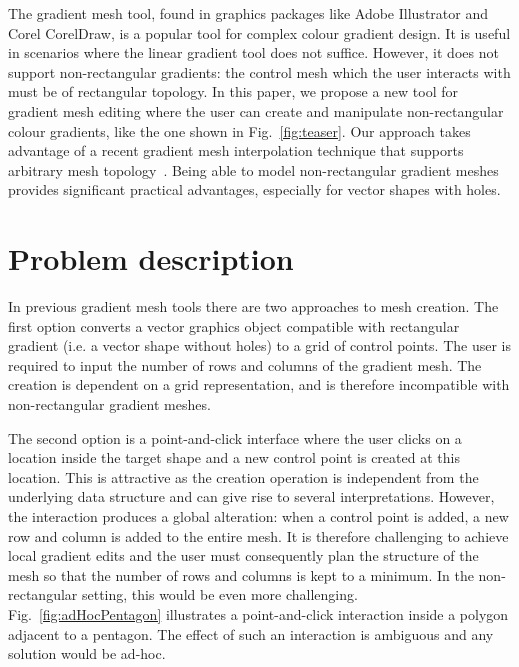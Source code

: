 \documentclass{egpubl}
\newcommand{\note}[3]{{\color{#2}\textbf{#1: #3}}}
\newcommand{\john}[1]{\note{JohnKa}{RubineRed}{#1}}
\begin{document}
	The gradient mesh tool, found in graphics packages like Adobe Illustrator and Corel CorelDraw, is a popular tool for complex colour gradient design. It is useful in scenarios where the linear gradient tool does not suffice. However, it does not support non-rectangular gradients: the control mesh which the user interacts with must be of rectangular topology. In this paper, we propose a new tool for gradient mesh editing where the user can create and manipulate non-rectangular colour gradients, like the one shown in Fig.~\ref{fig:teaser}. Our approach takes advantage of a recent gradient mesh interpolation technique that supports arbitrary mesh topology~\cite{Lieng:2016}. Being able to model non-rectangular gradient meshes provides significant practical advantages, especially for vector shapes with holes.
	
	
	\section{Problem description}
	\label{sec:overview}
	
	In previous gradient mesh tools there are two approaches to mesh creation. The first option converts a vector graphics object compatible with rectangular gradient (i.e. a vector shape without holes) to a grid of control points. The user is required to input the number of rows and columns of the gradient mesh. The creation is dependent on a grid representation, and is therefore incompatible with non-rectangular gradient meshes.
	
	The second option is a point-and-click interface where the user clicks on a location inside the target shape and a new control point is created at this location. This is attractive as the creation operation is independent from the underlying data structure and can give rise to several interpretations. However, the interaction produces a global alteration: when a control point is added, a new row and column is added to the entire mesh. It is therefore challenging to achieve local gradient edits and the user must consequently plan the structure of the mesh so that the number of rows and columns is kept to a minimum. In the non-rectangular setting, this would be even more challenging. Fig.~\ref{fig:adHocPentagon} illustrates a point-and-click interaction inside a polygon adjacent to a pentagon. The effect of such an interaction is ambiguous and any solution would be ad-hoc.
	
\end{document}
